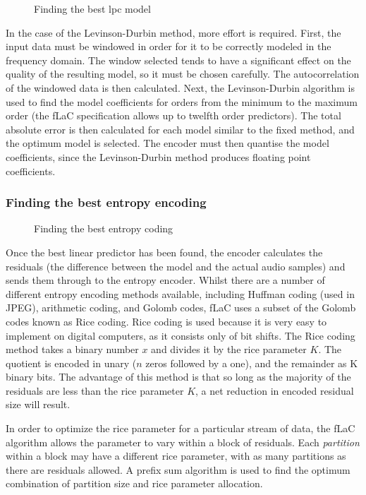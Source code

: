 \documentclass[12pt]{scrartcl}
\begin{document}
  
  \begin{figure}[H]
    \caption{Finding the best lpc model}
    \label{fig:lpc_optimisation}
  \end{figure}
  In the case of the Levinson-Durbin method, more effort is required. First, the input data must be windowed in order for it to be correctly modeled in the frequency domain. The window selected tends to have a significant effect on the quality of the resulting model, so it must be chosen carefully. The autocorrelation of the windowed data is then calculated. Next, the Levinson-Durbin algorithm is used to find the model coefficients for orders from the minimum to the maximum order (the fLaC specification allows up to twelfth order predictors\cite{flac_format}). The total absolute error is then calculated for each model similar to the fixed method, and the optimum model is selected. The encoder must then quantise the model coefficients, since the Levinson-Durbin method produces floating point coefficients.
  
  \subsubsection*{Finding the best entropy encoding}
  \begin{figure}[H]
    \caption{Finding the best entropy coding}
    \label{fig:entropy_optimisation}
  \end{figure}
  Once the best linear predictor has been found, the encoder calculates the residuals (the difference between the model and the actual audio samples) and sends them through to the entropy encoder. Whilst there are a number of different entropy encoding methods available, including Huffman coding (used in JPEG\cite{jpeg_standard}), arithmetic coding, and Golomb codes, fLaC uses a subset of the Golomb codes known as Rice coding. Rice coding is used because it is very easy to implement on digital computers, as it consists only of bit shifts. The Rice coding method takes a binary number \(x\) and divides it by the rice parameter \(K\). The quotient is encoded in unary (\(n\) zeros followed by a one), and the remainder as K binary bits. The advantage of this method is that so long as the majority of the residuals are less than the rice parameter \(K\), a net reduction in encoded residual size will result. 
  
  In order to optimize the rice parameter for a particular stream of data, the fLaC algorithm allows the parameter to vary within a block of residuals. Each \textit{partition} within a block may have a different rice parameter, with as many partitions as there are residuals allowed.  A prefix sum algorithm is used to find the optimum combination of partition size and rice parameter allocation.
  
\end{document}
